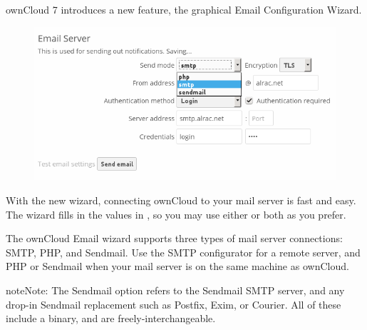 \documentclass[letterpaper,10pt,english]{sphinxmanual}
\begin{document}
ownCloud 7 introduces a new feature, the graphical Email Configuration Wizard.
\begin{figure}[htbp]
\centering

\includegraphics{smtp-config-wizard.png}
\end{figure}

With the new wizard, connecting ownCloud to your mail server is fast and easy.
The wizard fills in the values in , so you may use either
or both as you prefer.

The ownCloud Email wizard supports three types of mail server connections:
SMTP, PHP, and Sendmail. Use the SMTP configurator for a remote server, and PHP
or Sendmail when your mail server is on the same machine as ownCloud.

\begin{notice}{note}{Note:}
The Sendmail option refers to the Sendmail SMTP server, and any
drop-in Sendmail replacement such as Postfix, Exim, or Courier. All of
these include a  binary, and are freely-interchangeable.
\end{notice}
\end{document}

